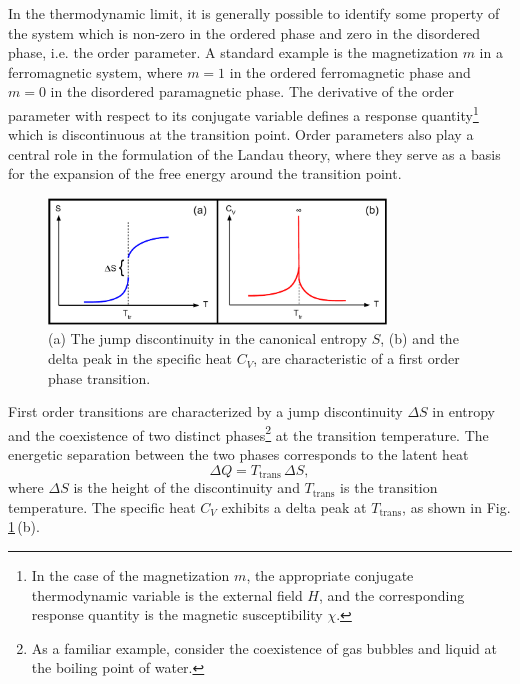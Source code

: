 \documentclass[12pt]{report}
\begin{document}
In the thermodynamic limit, it is generally possible to identify some property of the system which is non-zero in the ordered phase and zero in the disordered phase, i.e. the order parameter\cite{Bachmann2014,Landau2000}. A standard example is the magnetization $m$ in a ferromagnetic system, where $m = 1$ in the ordered ferromagnetic phase and $m = 0$ in the disordered paramagnetic phase. The derivative of the order parameter with respect to its conjugate variable defines a response quantity\footnote{In the case of the magnetization $m$, the appropriate conjugate thermodynamic variable is the external field $H$, and the corresponding response quantity is the magnetic susceptibility $\chi$.} which is discontinuous at the transition point. Order parameters also play a central role in the formulation of the Landau theory, where they serve as a basis for the expansion of the free energy around the transition point\cite{Kardar2009}. 

\begin{figure}
\center
\includegraphics[width = 0.8\textwidth]{chapter2Figs/CanonicalFirstOrder.pdf}
\caption{\label{fig:Fig_3}%
(a) The jump discontinuity in the canonical entropy $S$, (b) and the delta peak in the specific heat $C_{V}$, are characteristic of a first order phase transition.}
\end{figure} 

First order transitions are characterized by a jump discontinuity $\Delta S$ in entropy and the coexistence of two distinct phases\footnote{As a familiar example, consider the coexistence of gas bubbles and liquid at the boiling point of water.} at the transition temperature. The energetic separation between the two phases corresponds to the latent heat
\begin{equation}
\Delta Q = T_{\mathrm{trans}}\,\Delta S,
\end{equation}
where $\Delta S$ is the height of the discontinuity and $T_{\mathrm{trans}}$ is the transition temperature. The specific heat $C_{V}$ exhibits a delta peak at $T_{\mathrm{trans}}$, as shown in Fig. \ref{fig:Fig_3}\,(b).
\end{document}
